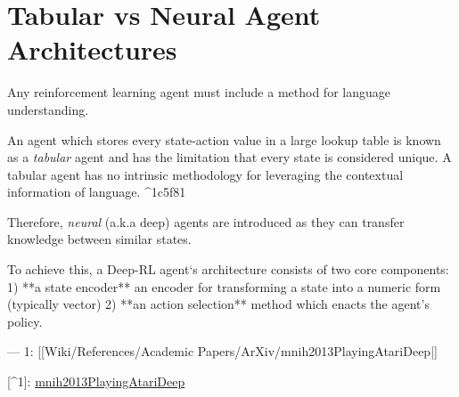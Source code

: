 \documentclass{article}
\title{}
\author{Philip Osborne}
\begin{document}
\maketitle
\section{Tabular vs Neural Agent Architectures}
\label{loc:tabular_vs_neural_agent_architectures}
Any reinforcement learning agent must include a method for language understanding. 

An agent which stores every state-action value in a large lookup table is known as a \emph{tabular} agent and has the limitation that every state is considered unique. A tabular agent has no intrinsic methodology for leveraging the contextual information of language.  ^1c5f81

Therefore, \emph{neural} (a.k.a deep) agents \cite[^1]{mnih2013PlayingAtariDeep} are introduced as they can transfer knowledge between similar states. 

To achieve this, a Deep-RL agent`s architecture consists of two core components: 
1) **a state encoder** an encoder for transforming a state into a numeric form (typically vector)
2) **an action selection** method which enacts the agent's policy.

---
1: [[Wiki/References/Academic Papers/ArXiv/mnih2013PlayingAtariDeep|\cite{mnih2013PlayingAtariDeep}]

[^1]: \hyperref[loc:wiki/references/academic_papers/arxiv/mnih2013playingatarideep.statement]{mnih2013PlayingAtariDeep}
\printbibliography
\end{document}
